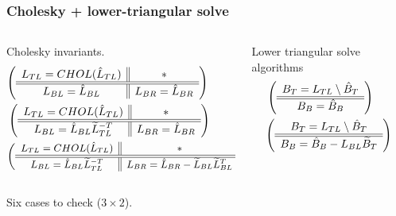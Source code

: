 \documentclass{beamer}
\begin{document}
\begin{frame}
  \frametitle{Cholesky + lower-triangular solve}
  \begin{columns}
    \begin{column}[t]{0.45\textwidth}
      Cholesky invariants.
      \begin{align*}
        &{\left( \begin{array}{c || c} L_{TL} = CHOL(\hat{L}_{TL}) & * \\ \hline \hline L_{BL} = \hat{L}_{BL} & L_{BR} = \hat{L}_{BR} \end{array} \right)}\\
        &\left( \begin{array}{c || c} L_{TL} = CHOL(\hat{L}_{TL}) & * \\ \hline \hline L_{BL} = \hat{L}_{BL}\widetilde{L}_{TL}^{-T} & L_{BR} = \hat{L}_{BR} \end{array} \right)\\
        &{\small \left( \begin{array}{c || c} L_{TL} = CHOL(\hat{L}_{TL}) & * \\ \hline \hline L_{BL} = \hat{L}_{BL}\widetilde{L}_{TL}^{-T} & L_{BR} = \hat{L}_{BR} - \widetilde{L}_{BL}\widetilde{L}_{BL}^T \end{array} \right)}
      \end{align*}
    \end{column}
    \begin{column}[t]{0.55\textwidth}
      Lower triangular solve algorithms
      \begin{align*}
        &\left( \begin{array}{c} B_T = L_{TL} \setminus \hat{B}_T \\ \hline \hline B_B = \hat{B}_B \end{array} \right)\\
        &{\left( \begin{array}{c} B_T = L_{TL} \setminus \hat{B}_T \\ \hline \hline B_B = \hat{B}_B - L_{BL}\widetilde{B}_T \end{array} \right)}
      \end{align*}
    \end{column}
  \end{columns}

  Six cases to check ($3 \times 2$).
\end{frame}
\end{document}
